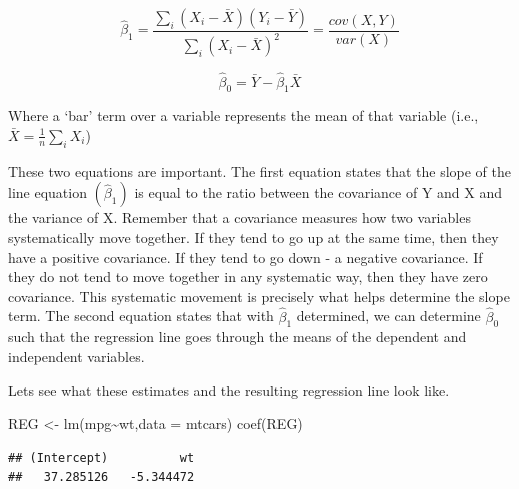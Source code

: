 \documentclass[
]{book}
\newenvironment{Shaded}{\begin{snugshade}}{\end{snugshade}}
\newcommand{\AttributeTok}[1]{\textcolor[rgb]{0.77,0.63,0.00}{#1}}
\newcommand{\DecValTok}[1]{\textcolor[rgb]{0.00,0.00,0.81}{#1}}
\newcommand{\FunctionTok}[1]{\textcolor[rgb]{0.00,0.00,0.00}{#1}}
\newcommand{\NormalTok}[1]{#1}
\newcommand{\OtherTok}[1]{\textcolor[rgb]{0.56,0.35,0.01}{#1}}
\newcommand{\SpecialCharTok}[1]{\textcolor[rgb]{0.00,0.00,0.00}{#1}}
\newcommand{\StringTok}[1]{\textcolor[rgb]{0.31,0.60,0.02}{#1}}
\begin{document}
\[\hat{\beta}_1=\frac{\sum_i (X_i-\bar{X})(Y_i-\bar{Y})}{\sum_i(X_i-\bar{X})^2}=\frac{cov(X,Y)}{var(X)}\]

\[\hat{\beta}_0=\bar{Y}-\hat{\beta}_1\bar{X}\]

Where a `bar' term over a variable represents the mean of that variable (i.e., \(\bar{X}=\frac{1}{n}\sum_iX_i\))

These two equations are important. The first equation states that the slope of the line equation \((\hat{\beta}_1)\) is equal to the ratio between the covariance of Y and X and the variance of X. Remember that a covariance measures how two variables systematically move together. If they tend to go up at the same time, then they have a positive covariance. If they tend to go down - a negative covariance. If they do not tend to move together in any systematic way, then they have zero covariance. This systematic movement is precisely what helps determine the slope term. The second equation states that with \(\hat{\beta}_1\) determined, we can determine \(\hat{\beta}_0\) such that the regression line goes through the means of the dependent and independent variables.

Lets see what these estimates and the resulting regression line look like.

\begin{Shaded}
\begin{Highlighting}[]
\NormalTok{REG }\OtherTok{\textless{}{-}} \FunctionTok{lm}\NormalTok{(mpg}\SpecialCharTok{\textasciitilde{}}\NormalTok{wt,}\AttributeTok{data =}\NormalTok{ mtcars)}
\FunctionTok{coef}\NormalTok{(REG)}
\end{Highlighting}
\end{Shaded}

\begin{verbatim}
## (Intercept)          wt 
##   37.285126   -5.344472
\end{verbatim}

\begin{Shaded}
\end{Shaded}
\end{document}
